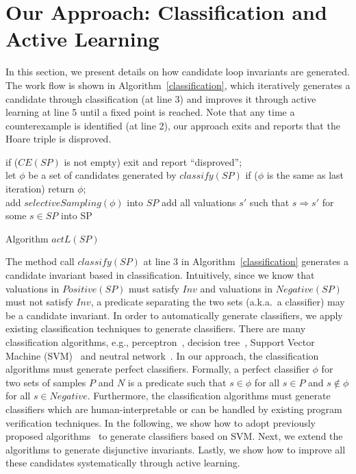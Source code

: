 \section{Our Approach: Classification and Active Learning}
\label{sec:classifierlearning}
In this section, we present details on how candidate loop invariants are generated. The work flow is shown in Algorithm~\ref{classification}, which iteratively generates a candidate through classification (at line 3) and improves it through active learning at line 5 until a fixed point is reached. Note that any time a counterexample is identified (at line 2), our approach exits and reports that the Hoare triple is disproved.

\begin{algorithm}[t]
\SetAlgoVlined
\Indm
\Indp
{} {
    if ($CE(SP)$ is not empty) { exit and report ``disproved''; } \\
    let $\phi$ be a set of candidates generated by $classify(SP)$\;
    if ($\phi$ is the same as last iteration){ return $\phi$; } \\
    add $selectiveSampling(\phi)$ into $SP$\;
    add all valuations $s'$ such that $s \Rightarrow s'$ for some $s \in SP$ into SP\;
}
\caption{Algorithm $actL(SP)$}
\label{classification}
\end{algorithm}

The method call $classify(SP)$ at line 3 in Algorithm~\ref{classification} generates a candidate invariant based in classification. Intuitively, since we know that valuations in $Positive(SP)$ must satisfy $Inv$ and valuations in $Negative(SP)$ must not satisfy $Inv$, a predicate separating the two sets (a.k.a.~a classifier) may be a candidate invariant. In order to automatically generate classifiers, we apply existing classification techniques to generate classifiers. There are many classification algorithms, e.g., perceptron~\cite{perceptron}, decision tree~\cite{quinlan1986induction}, Support Vector Machine (SVM)~\cite{svm:original} and neutral network~\cite{nn}.
In our approach, the classification algorithms must generate perfect classifiers. Formally, a perfect classifier $\phi$ for two sets of samples $P$ and $N$ is a predicate such that $s \in \phi$ for all $s \in P$ and $s \not \in \phi$ for all $s \in Negative$. Furthermore, the classification algorithms must generate classifiers which are human-interpretable or can be handled by existing program verification techniques.
In the following, we show how to adopt previously proposed algorithms~\cite{sharma2012interpolants} to generate classifiers based on SVM. Next, we extend the algorithms to generate disjunctive invariants. Lastly, we show how to improve all these candidates systematically through active learning.

